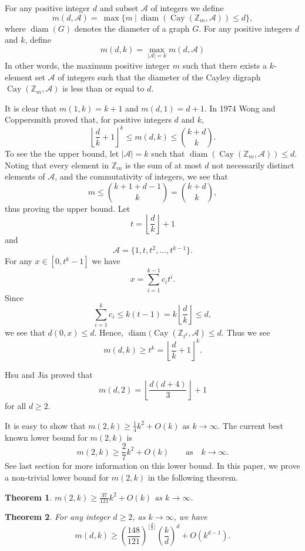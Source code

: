 \documentclass[11pt]{article}
\newtheorem{theorem}{Theorem}
\theoremstyle{definition}
\def\Z{\mbox{$\mathbb Z$}}
\def\Cay{\operatorname{Cay}}
\def\diam{\operatorname{diam}}
\begin{document}
For any positive integer $d$ and subset $\mathscr{A}$ of integers we define
\[
m(d,\mathscr{A}) =\ \max\{m \  \vert \  \diam(\Cay(\mathbb{Z}_m,\mathscr{A})) \leq d\},
\]
where $\diam(G)$ denotes the diameter of a graph $G$. For any positive integers $d$ and $k$, define
\[
m(d, k) = \max_{\scriptstyle |\mathscr{A}|=k}{m(d,\mathscr{A})}
\]
In other words, the maximum positive integer $m$ such that there exists a $k$-element set $\mathscr{A}$ of integers such that the diameter of the Cayley digraph $\Cay(\mathbb{Z}_m,\mathscr{A})$ is less than or equal to $d$. 

It is clear that $m(1,k) = k+1$ and $m(d,1) = d+1$.
In 1974 Wong and Coppersmith \cite{Wong-Coppersmith:1974} proved that, for positive integers $d$ and $k$,
\[
\left \lfloor \frac dk + 1 \right \rfloor^k \leq m(d, k) \leq  \binom{k + d}k . 
\]
To see the the upper bound, let $|\mathscr{A}| = k$ such that $\diam(\Cay(\Z_m, \mathscr{A})) \leq d$. Noting that every element in $\Z_m$ is the sum of at most $d$ not necessarily distinct elements of $\mathscr{A}$, and the commutativity of integers,  we see that
\[
m \leq \binom{k + 1 + d - 1}k = \binom{k + d}k,
\] 
thus proving the upper bound.
Let
\[t = \left \lfloor \frac{d}{k} \right \rfloor + 1\]
and 
\[\mathscr{A} = \{1, t, t^2, ... , t^{k-1}\}.\]
For any $x \in [0, t^k -1]$ we have
\[x = \sum_{i=1}^{k - 1}c_it^i.\]
Since 
\[
\sum_{i=1}^{k} c_i \leq k(t - 1) = k \left \lfloor \frac dk \right \rfloor  \leq d,
\]
we see that $d(0, x) \leq d$. Hence, $\diam(\Cay(\Z_{t^k}, \mathscr{A}) \leq d$. Thus we see
\[m(d, k) \geq t^k  = \left \lfloor \frac dk + 1 \right \rfloor^k.
\]

Hsu and Jia \cite{JiaHsu} proved that 
\begin{equation}\label{eqn:m(d,2)>27}
m(d,2) =\left \lfloor \frac{d(d+4)}{3}\right \rfloor+1
\end{equation}
for all $d\geq2$. 

It is easy to show that $m(2,k)\ge \frac14k^{2}+O(k)$ as $k\to\infty$.  The current best known lower bound for $m(2,k)$ is
\[
m(2,k)\ge\frac27k^{2}+O(k)\qquad\text{as}\quad k\to\infty.
\]
See last section for more information on this lower bound.
In this paper, we prove a non-trivial lower bound for $m(2,k)$ in the following theorem.

\begin{theorem}\label{thm:m(2k)}
$\displaystyle m(2,k) \geq \frac{37}{121}k^2 + O(k)$  as $ k \to \infty$.
\end{theorem}

\begin{theorem}\label{thm:m(dk)}
For any integer $d \geq 2$, as $k \to \infty$, we have 
\[
m(d,k) \geq \left(\frac{148}{121}\right)^{\lfloor \frac{d}{2}\rfloor}\left(\frac{k}{d}\right)^d + O(k^{d-1}).
\]
\end{theorem}
 
\end{document}
